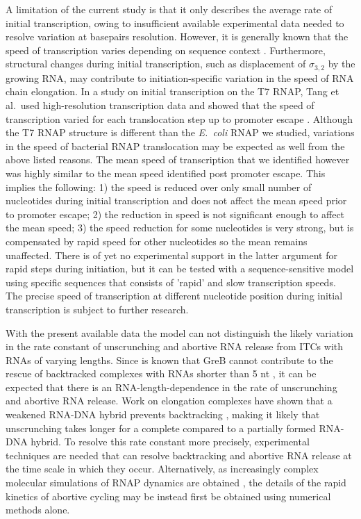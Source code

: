 A limitation of the current study is that it only describes the average rate
of initial transcription, owing to insufficient available experimental data
needed to resolve variation at basepairs resolution. However, it is generally
known that the speed of transcription varies depending on sequence context
\cite{bai_mechanochemical_2007,malinen_active_2012}. Furthermore, structural
changes during initial transcription, such as displacement of $\sigma_{3,2}$
by the growing RNA, may contribute to initiation-specific variation in the
speed of RNA chain elongation. In a study on initial transcription on the T7
RNAP, Tang et al.\ used high-resolution transcription data and showed that the
speed of transcription varied for each translocation step up to promoter
escape \cite{tang_real-time_2009}. Although the T7 RNAP structure is different
than the \textit{E.\ coli} RNAP we studied, variations in the speed of
bacterial RNAP translocation may be expected as well from the above listed
reasons. The mean speed of transcription that we identified however was highly
similar to the mean speed identified post promoter escape. This implies the
following: 1) the speed is reduced over only small number of nucleotides during
initial transcription and does not affect the mean speed prior to promoter
escape; 2) the reduction in speed is not significant enough to affect the mean
speed; 3) the speed reduction for some nucleotides is very strong, but is
compensated by rapid speed for other nucleotides so the mean remains
unaffected. There is of yet no experimental support in the latter argument for
rapid steps during initiation, but it can be tested with a sequence-sensitive
model using specific sequences that consists of 'rapid' and slow transcription
speeds. The precise speed of transcription at different nucleotide position
during initial transcription is subject to further research.

With the present available data the model can not distinguish the likely
variation in the rate constant of unscrunching and abortive RNA release from
ITCs with RNAs of varying lengths. Since is known that GreB cannot contribute
to the rescue of backtracked complexes with RNAs shorter than 5 nt
\cite{hsu_initial_2006}, it can be expected that there is an
RNA-length-dependence in the rate of unscrunching and abortive RNA release.
Work on elongation complexes have shown that a weakened RNA-DNA hybrid
prevents backtracking \cite{nudler_rnadna_1997}, making it likely that
unscrunching takes longer for a complete compared to a partially formed
RNA-DNA hybrid. To resolve this rate constant more precisely, experimental
techniques are needed that can resolve backtracking and abortive RNA release
at the time scale in which they occur. Alternatively, as increasingly complex
molecular simulations of RNAP dynamics are obtained
\cite{silva_millisecond_2014}, the details of the rapid kinetics of abortive
cycling may be instead first be obtained using numerical methods alone.

